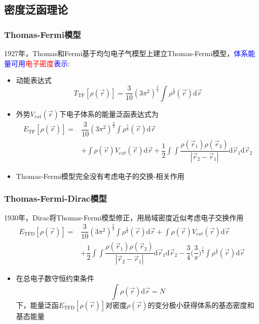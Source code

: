 \documentclass[cjk,slidestop,compress,mathserif,blue]{beamer}
\begin{document}
\subsection{密度泛函理论}       %
\frame
{
	\frametitle{\textrm{Thomas-Fermi}模型} 
	1927年，\textrm{Thomas}和\textrm{Fermi}基于均匀电子气模型上建立\textrm{Thomas-Fermi}模型，\textcolor{blue}{体系能量可用}\textcolor{red}{电子密度}\textcolor{blue}{表示}:
	\begin{itemize}
		\item 动能表达式
			$$T_{\mathrm{TF}}[\rho(\vec r)]=\dfrac3{10}(3\pi^2)^{\frac23}\int\rho^{\frac53}(\vec r)\mathrm{d}\vec r$$
		\item 外势$V_{ext}(\vec r)$下电子体系的能量泛函表达式为
			\begin{displaymath}
				\begin{aligned}
					E_{\mathrm{TF}}[\rho(\vec r)]=&\dfrac3{10}(3\pi^2)^{\frac23}\int\rho^{\frac53}(\vec r)\mathrm{d}\vec r\\
					&+\int\rho(\vec r)V_{ext}(\vec r)\mathrm{d}\vec r+\dfrac12\int\int\dfrac{\rho(\vec r_1)\rho(\vec r_2)}{|\vec r_2-\vec r_1|}\mathrm{d}\vec r_1\mathrm{d}\vec r_2
				\end{aligned}
			\end{displaymath}
		\item \textrm{Thomas-Fermi}模型完全没有考虑电子的交换-相关作用
	\end{itemize}
}

\frame
{
	\frametitle{\textrm{Thomas-Fermi-Dirac}模型} 
	1930年，\textrm{Dirac}将\textrm{Thomas-Fermi}模型修正，用局域密度近似考虑电子交换作用
			\begin{displaymath}
				\begin{aligned}
					E_{\mathrm{TFD}}[\rho(\vec r)]=&\dfrac3{10}(3\pi^2)^{\frac23}\int\rho^{\frac53}(\vec r)\mathrm{d}\vec r+\int\rho(\vec r)V_{ext}(\vec r)\mathrm{d}\vec r\\
					&+\dfrac12\int\int\dfrac{\rho(\vec r_1)\rho(\vec r_2)}{|\vec r_2-\vec r_1|}\mathrm{d}\vec r_1\mathrm{d}\vec r_2-\dfrac34\bigg(\dfrac3{\pi}\bigg)^{\frac13}\int\rho^{\frac43}(\vec r)\mathrm{d}\vec r
				\end{aligned}
			\end{displaymath}
			\begin{itemize}
				\item 在总电子数守恒约束条件
					$$\int\rho(\vec r)\mathrm{d}\vec r=N$$
					下，能量泛函$E_{\mathrm{TFD}}[\rho(\vec r)]$对密度$\rho(\vec r)$的变分极小获得体系的基态密度和基态能量
			\end{itemize}
}
\end{document}
